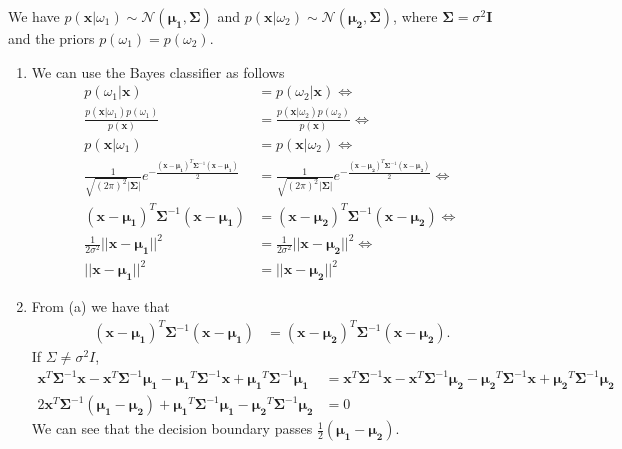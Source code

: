 \documentclass[12pt]{book}
\begin{document}
We have $p(\pmb{x}|\omega_1) \sim \mathcal{N}(\pmb{\mu_1},\pmb{\Sigma})$ and $p(\pmb{x}|\omega_2) \sim \mathcal{N}(\pmb{\mu_2},\pmb{\Sigma})$, where $\pmb{\Sigma}=\sigma^2 \pmb{I}$ and the priors $p(\omega_1) = p(\omega_2)$.

\begin{enumerate}[label=(\alph*)]
	\item We can use the Bayes classifier as follows
	\begin{align*}
	p(\omega_1|\pmb{x}) &= p(\omega_2|\pmb{x}) \iff \\ \frac{p(\pmb{x}|\omega_1)p(\omega_1)}{p(\pmb{x})} &= \frac{p(\pmb{x}|\omega_2)p(\omega_2)}{p(\pmb{x})}  \iff \\ p(\pmb{x}|\omega_1) &= p(\pmb{x}|\omega_2) \iff \\
	\frac{1}{\sqrt{(2\pi)^2}|\pmb{\Sigma}|}e^{-\frac{(\pmb{x}-\pmb{\mu_1})^T\pmb{\Sigma}^{-1}(\pmb{x - \pmb{\mu_1}})}{2}} &= \frac{1}{\sqrt{(2\pi)^2}|\pmb{\Sigma}|}e^{-\frac{(\pmb{x}-\pmb{\mu_2})^T\pmb{\Sigma}^{-1}(\pmb{x - \pmb{\mu_2}})}{2}} \iff \\
	(\pmb{x}-\pmb{\mu_1})^T\pmb{\Sigma}^{-1}(\pmb{x - \pmb{\mu_1}}) &= (\pmb{x}-\pmb{\mu_2})^T\pmb{\Sigma}^{-1}(\pmb{x - \pmb{\mu_2}}) \iff \\
	\frac{1}{2\sigma^2} ||\pmb{x}-\pmb{\mu_1}||^2 &= \frac{1}{2\sigma^2} ||\pmb{x}-\pmb{\mu_2}||^2 \iff \\
	||\pmb{x}-\pmb{\mu_1}||^2 &= ||\pmb{x}-\pmb{\mu_2}||^2
	\end{align*}
	\item From (a) we have that
	\begin{align*}
	(\pmb{x}-\pmb{\mu_1})^T\pmb{\Sigma}^{-1}(\pmb{x - \pmb{\mu_1}}) &= (\pmb{x}-\pmb{\mu_2})^T\pmb{\Sigma}^{-1}(\pmb{x - \pmb{\mu_2}}).
	\end{align*}
	If $\Sigma \neq \sigma^2 I$,
	\begin{align*}
	\pmb{x}^T \pmb{\Sigma}^{-1}\pmb{x} - \pmb{x}^T \pmb{\Sigma}^{-1}\pmb{\mu_1} - \pmb{\mu_1}^T \pmb{\Sigma}^{-1}\pmb{x} + \pmb{\mu_1}^T \pmb{\Sigma}^{-1}\pmb{\mu_1}  &= \pmb{x}^T \pmb{\Sigma}^{-1}\pmb{x} - \pmb{x}^T \pmb{\Sigma}^{-1}\pmb{\mu_2} - \pmb{\mu_2}^T \pmb{\Sigma}^{-1}\pmb{x} + \pmb{\mu_2}^T \pmb{\Sigma}^{-1}\pmb{\mu_2} \\
	2\pmb{x}^T \pmb{\Sigma}^{-1}(\pmb{\mu_1} - \pmb{\mu_2}) +  \pmb{\mu_1}^T \pmb{\Sigma}^{-1}\pmb{\mu_1} - \pmb{\mu_2}^T \pmb{\Sigma}^{-1}\pmb{\mu_2} &= 0 
	\end{align*}
	We can see that the decision boundary passes $\frac{1}{2}(\pmb{\mu_1}-\pmb{\mu_2})$.
\end{enumerate}
\end{document}

